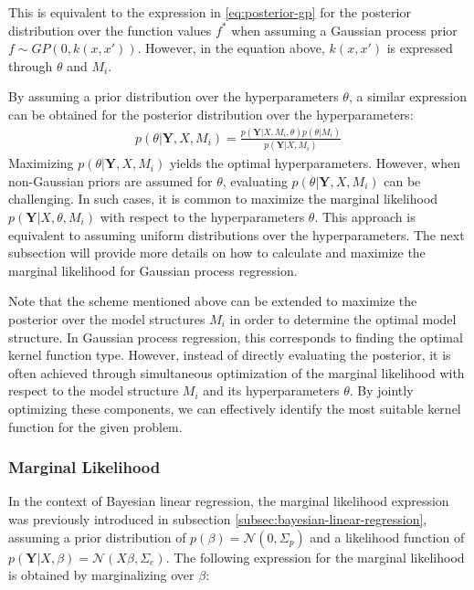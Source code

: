 This is equivalent to the expression in \ref{eq:posterior-gp} for the posterior distribution over the
function values $f^{\ast}$ when assuming a Gaussian process prior $f \sim GP(0, k(x,x'))$.
However, in the equation above, $k(x,x')$ is expressed through $\theta$ and $M_i$.

By assuming a prior distribution over the hyperparameters $\theta$, a similar expression can be obtained for
the posterior distribution over the hyperparameters:
\begin{gather*}
    p(\theta | \mathbf{Y}, X, M_i) = \frac{p( \mathbf{Y}| X,M_i, \theta)
        p(\theta| M_i)}{p(\mathbf{Y}|X, M_i)}
\end{gather*}
Maximizing $p(\theta | \mathbf{Y}, X, M_i)$ yields the optimal hyperparameters.
However, when non-Gaussian priors are assumed for $\theta$, evaluating $p(\theta | \mathbf{Y}, X, M_i)$
can be challenging.
In such cases, it is common to maximize the marginal likelihood $p(\mathbf{Y} | X, \theta, M_i)$
with respect to the hyperparameters $\theta$.
This approach is equivalent to assuming uniform distributions over the hyperparameters.
The next subsection will provide more details on how to calculate and maximize the
marginal likelihood for Gaussian process regression.

Note that the scheme mentioned above can be extended to maximize the posterior over the model structures
$M_i$ in order to determine the optimal model structure.
In Gaussian process regression, this corresponds to finding the optimal kernel function type.
However, instead of directly evaluating the posterior, it is often achieved through simultaneous optimization of
the marginal likelihood with respect to the model structure $M_i$ and its hyperparameters $\theta$.
By jointly optimizing these components, we can effectively identify the most suitable kernel function for
the given problem.





\subsubsection{Marginal Likelihood}

In the context of Bayesian linear regression, the marginal likelihood expression was previously
introduced in subsection \ref{subsec:bayesian-linear-regression},
assuming a prior distribution of $p(\beta) = \mathcal{N}(0, \Sigma_p)$ and a likelihood function of
$p(\mathbf{Y} | X, \beta) = \mathcal{N}(X \beta, \Sigma_e)$.
The following expression for the marginal likelihood is obtained by marginalizing over $\beta$:

